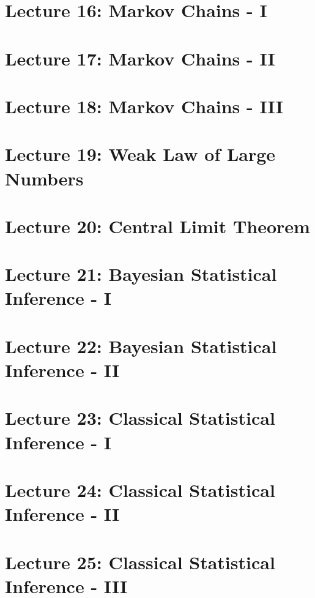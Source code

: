 \documentclass{article}
\begin{document}
\section{Lecture 16: Markov Chains - I}



\section{Lecture 17: Markov Chains - II}



\section{Lecture 18: Markov Chains - III}



\section{Lecture 19: Weak Law of Large Numbers}



\section{Lecture 20: Central Limit Theorem}



\section{Lecture 21: Bayesian Statistical Inference - I}



\section{Lecture 22: Bayesian Statistical Inference - II}



\section{Lecture 23: Classical Statistical Inference - I}



\section{Lecture 24: Classical Statistical Inference - II}




\section{Lecture 25: Classical Statistical Inference - III}


\end{document}
